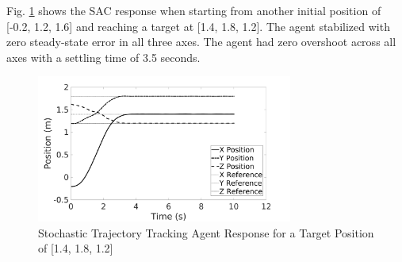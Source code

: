     Fig. \ref{trpos2} shows the SAC response when starting from another initial position of [-0.2, 1.2, 1.6] and reaching a target at [1.4, 1.8, 1.2]. The agent stabilized with zero steady-state error in all three axes. The agent had zero overshoot across all axes with a settling time of 3.5 seconds.
    \begin{figure}[H]
            \centering
            \includegraphics[width=0.75\textwidth]{plots/track2_pos.jpg}
            \caption{Stochastic Trajectory Tracking Agent Response for a Target Position of [1.4, 1.8, 1.2]}
            \label{trpos2}
    \end{figure}\clearpage
